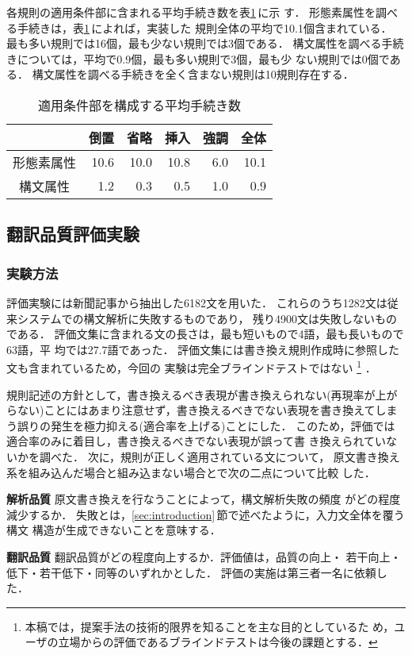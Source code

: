 各規則の適用条件部に含まれる平均手続き数を表\ref{tab:rule_complex}\,に示
す．
形態素属性を調べる手続きは，表\ref{tab:rule_complex}\,によれば，実装した
規則全体の平均で10.1個含まれている．
最も多い規則では16個，最も少ない規則では3個である．
構文属性を調べる手続きについては，平均で0.9個，最も多い規則で3個，最も少
ない規則では0個である．
構文属性を調べる手続きを全く含まない規則は10規則存在する．
\begin{table}[htbp]
\caption{適用条件部を構成する平均手続き数}
\label{tab:rule_complex}
\begin{center}
\begin{tabular}{|c||r|r|r|r|r|}\hline
&\multicolumn{1}{|c|}{倒置}&\multicolumn{1}{|c|}{省略}
&\multicolumn{1}{|c|}{挿入}&\multicolumn{1}{|c|}{強調}
&\multicolumn{1}{|c|}{全体}\\\hline\hline
形態素属性  &10.6 & 10.0 & 10.8 & 6.0 & 10.1 \\\hline
構文属性    & 1.2 &  0.3 &  0.5 & 1.0 &  0.9 \\\hline
\end{tabular}
\end{center}
\end{table}

\subsection{翻訳品質評価実験}

\subsubsection{実験方法}

評価実験には新聞記事\cite{Lewis97}から抽出した6182文を用いた．
これらのうち1282文は従来システムでの構文解析に失敗するものであり，
残り4900文は失敗しないものである．
評価文集に含まれる文の長さは，最も短いもので4語，最も長いもので63語，平
均では27.7語であった．
評価文集には書き換え規則作成時に参照した文も含まれているため，今回の
実験は完全ブラインドテストではない
\footnote{本稿では，提案手法の技術的限界を知ることを主な目的としているた
め，ユーザの立場からの評価であるブラインドテストは今後の課題とする．}
．

規則記述の方針として，書き換えるべき表現が書き換えられない(再現率が上が
らない)ことにはあまり注意せず，書き換えるべきでない表現を書き換えてしま
う誤りの発生を極力抑える(適合率を上げる)ことにした．
このため，評価では適合率のみに着目し，書き換えるべきでない表現が誤って書
き換えられていないかを調べた．
次に，規則が正しく適用されている文について，
原文書き換え系を組み込んだ場合と組み込まない場合とで次の二点について比較
した．
\begin{LIST}
\item[\bf 解析品質] 原文書き換えを行なうことによって，構文解析失敗の頻度
がどの程度減少するか．
失敗とは，\ref{sec:introduction}\,節で述べたように，入力文全体を覆う構文
構造が生成できないことを意味する．
\item[\bf 翻訳品質] 翻訳品質がどの程度向上するか．評価値は，品質の向上・
若干向上・低下・若干低下・同等のいずれかとした．
評価の実施は第三者一名に依頼した．
\end{LIST}

